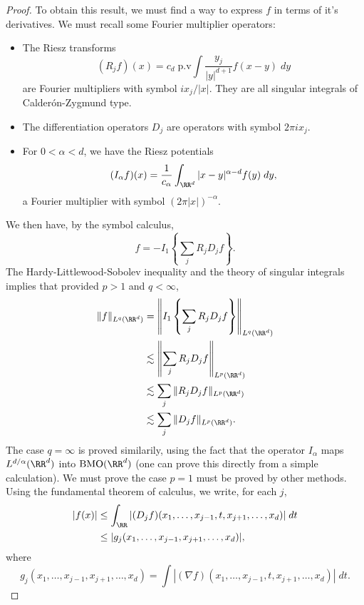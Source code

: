 \begin{proof}
    To obtain this result, we must find a way to express $f$ in terms of it's derivatives. We must recall some Fourier multiplier operators:
    \begin{itemize}
        \item The Riesz transforms
        \[ (R_j f)(x) = c_d\; \text{p.v} \int \frac{y_j}{|y|^{d+1}} f(x - y)\; dy \]
        are Fourier multipliers with symbol $i x_j / |x|$. They are all singular integrals of Calder\'{o}n-Zygmund type.

        \item The differentiation operators $D_j$ are operators with symbol $2 \pi i x_j$.

        \item For $0 < \alpha < d$, we have the Riesz potentials
        \[ (I_\alpha f)(x) = \frac{1}{c_\alpha} \int_{\RR^d} |x - y|^{\alpha - d} f(y)\; dy, \]
        a Fourier multiplier with symbol $(2 \pi |x|)^{-\alpha}$.
    \end{itemize}
    We then have, by the symbol calculus,
    \[ f = - I_1 \left\{ \sum_j R_j D_j f \right\}. \]
    The Hardy-Littlewood-Sobolev inequality and the theory of singular integrals implies that provided $p > 1$ and $q < \infty$,
    \begin{align*}
        \| f \|_{L^q(\RR^d)} &= \left\| I_1 \left\{ \sum_j R_j D_j f \right\} \right\|_{L^q(\RR^d)}\\
        &\lesssim \left\| \sum_j R_j D_j f \right\|_{L^p(\RR^d)}\\
        &\lesssim \sum_j \| R_j D_j f \|_{L^p(\RR^d)}\\
        &\lesssim \sum_j \| D_j f \|_{L^p(\RR^d)}.
    \end{align*}
    The case $q = \infty$ is proved similarily, using the fact that the operator $I_\alpha$ maps $L^{d/\alpha}(\RR^d)$ into $\text{BMO}(\RR^d)$ (one can prove this directly from a simple calculation). We must prove the case $p = 1$ must be proved by other methods. Using the fundamental theorem of calculus, we write, for each $j$,
    \begin{align*}
        |f(x)| &\leq \int_{\RR} |(D_j f)(x_1,\dots,x_{j-1},t,x_{j+1},\dots,x_d)|\; dt\\
        &\leq |g_j(x_1,\dots,x_{j-1},x_{j+1},\dots,x_d)|,
    \end{align*}
    where
    \[ g_j(x_1,\dots,x_{j-1},x_{j+1},\dots,x_d) = \int |(\nabla f)(x_1,\dots,x_{j-1},t,x_{j+1},\dots,x_d)|\; dt. \]

\end{proof}
